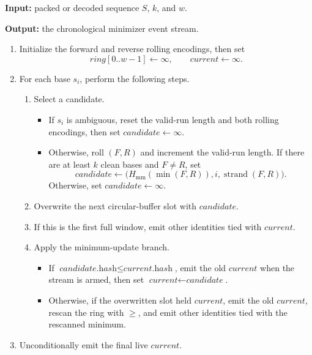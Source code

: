\begin{algorithm}[H]
\caption{Minimap-style scalar event collector, including the semantic branches}
\label{alg:minimap-scalar-events}
\small
\textbf{Input:} packed or decoded sequence \(S\), \(k\), and \(w\).

\textbf{Output:} the chronological minimizer event stream.

\begin{enumerate}
  \item Initialize the forward and reverse rolling encodings, then set
    \[
      \textit{ring}[0..w-1]\gets\infty,
      \qquad
      \textit{current}\gets\infty.
    \]
  \item For each base \(s_i\), perform the following steps.
    \begin{enumerate}
      \item Select a candidate.
        \begin{itemize}
          \item If \(s_i\) is ambiguous, reset the valid-run length and both
            rolling encodings, then set
            \(\textit{candidate}\gets\infty\).
          \item Otherwise, roll \((F,R)\) and increment the valid-run length.
            If there are at least \(k\) clean bases and \(F\ne R\), set
            \[
              \textit{candidate}\gets
              \bigl(H_{\mathrm{mm}}(\min(F,R)),i,
              \operatorname{strand}(F,R)\bigr).
            \]
            Otherwise, set \(\textit{candidate}\gets\infty\).
        \end{itemize}
      \item Overwrite the next circular-buffer slot with
        \(\textit{candidate}\).
      \item If this is the first full window, emit other identities tied with
        \(\textit{current}\).
      \item Apply the minimum-update branch.
        \begin{itemize}
          \item If
            \(\textit{candidate.hash}\le\textit{current.hash}\), emit the old
            \(\textit{current}\) when the stream is armed, then set
            \(\textit{current}\gets\textit{candidate}\).
          \item Otherwise, if the overwritten slot held
            \(\textit{current}\), emit the old \(\textit{current}\), rescan the
            ring with \(\ge\), and emit other identities tied with the
            rescanned minimum.
        \end{itemize}
    \end{enumerate}
  \item Unconditionally emit the final live \(\textit{current}\).
\end{enumerate}
\end{algorithm}


